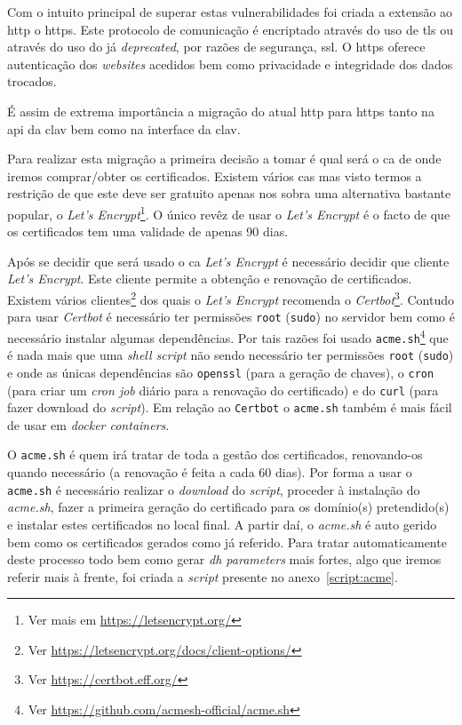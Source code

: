 Com o intuito principal de superar estas vulnerabilidades foi criada a extensão ao \acrshort{http} o \acrfull{https}. Este protocolo de comunicação é encriptado através do uso de \acrfull{tls} ou através do uso do já \textit{deprecated}, por razões de segurança, \acrfull{ssl}. O \acrshort{https} oferece autenticação dos \textit{websites} acedidos bem como privacidade e integridade dos dados trocados.  

É assim de extrema importância a migração do atual \acrshort{http} para \acrshort{https} tanto na \acrshort{api} da \acrshort{clav} bem como na interface da \acrshort{clav}.

Para realizar esta migração a primeira decisão a tomar é qual será o \acrfull{ca} de onde iremos comprar/obter os certificados. Existem vários \acrshort{ca}s mas visto termos a restrição de que este deve ser gratuito apenas nos sobra uma alternativa bastante popular, o \textit{Let's Encrypt}\footnote{Ver mais em \url{https://letsencrypt.org/}}. O único revêz de usar o \textit{Let's Encrypt} é o facto de que os certificados tem uma validade de apenas 90 dias.

Após se decidir que será usado o \acrshort{ca} \textit{Let's Encrypt} é necessário decidir que cliente \textit{Let's Encrypt}. Este cliente permite a obtenção e renovação de certificados. Existem vários clientes\footnote{Ver \url{https://letsencrypt.org/docs/client-options/}} dos quais o \textit{Let's Encrypt} recomenda o \textit{Certbot}\footnote{Ver \url{https://certbot.eff.org/}}. Contudo para usar \textit{Certbot} é necessário ter permissões \texttt{root} (\texttt{sudo}) no servidor bem como é necessário instalar algumas dependências. Por tais razões foi usado \texttt{acme.sh}\footnote{Ver \url{https://github.com/acmesh-official/acme.sh}} que é nada mais que uma \textit{shell script} não sendo necessário ter permissões \texttt{root} (\texttt{sudo}) e onde as únicas dependências são \texttt{openssl} (para a geração de chaves), o \texttt{cron} (para criar um \textit{cron job} diário para a renovação do certificado) e do \texttt{curl} (para fazer download do \textit{script}). Em relação ao \texttt{Certbot} o \texttt{acme.sh} também é mais fácil de usar em \textit{docker containers}.

O \texttt{acme.sh} é quem irá tratar de toda a gestão dos certificados, renovando-os quando necessário (a renovação é feita a cada 60 dias).
Por forma a usar o \texttt{acme.sh} é necessário realizar o \textit{download} do \textit{script}, proceder à instalação do \textit{acme.sh}, fazer a primeira geração do certificado para os domínio(s) pretendido(s) e instalar estes certificados no local final. A partir daí, o \textit{acme.sh} é auto gerido bem como os certificados gerados como já referido. Para tratar automaticamente deste processo todo bem como gerar \textit{\acrshort{dh} parameters} mais fortes, algo que iremos referir mais à frente, foi criada a \textit{script} presente no anexo~\ref{script:acme}.

